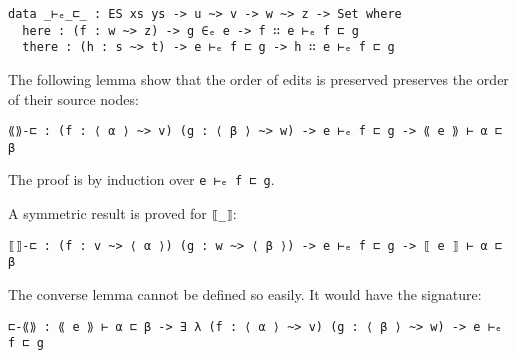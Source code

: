 \documentclass[../Thesis.tex]{subfiles}
\begin{document}
\begin{verbatim}
data _⊢ₑ_⊏_ : ES xs ys -> u ~> v -> w ~> z -> Set where
  here : (f : w ~> z) -> g ∈ₑ e -> f ∷ e ⊢ₑ f ⊏ g 
  there : (h : s ~> t) -> e ⊢ₑ f ⊏ g -> h ∷ e ⊢ₑ f ⊏ g 
\end{verbatim}

	The following lemma show that the order of edits is preserved
	preserves the order of their source nodes:	
\begin{verbatim}
⟪⟫-⊏ : (f : ⟨ α ⟩ ~> v) (g : ⟨ β ⟩ ~> w) -> e ⊢ₑ f ⊏ g -> ⟪ e ⟫ ⊢ α ⊏ β
\end{verbatim}

	The proof is by induction over \texttt{e ⊢ₑ f ⊏ g}.
%
	
	A symmetric result is proved for \texttt{⟦\_⟧}:
\begin{verbatim}
⟦⟧-⊏ : (f : v ~> ⟨ α ⟩) (g : w ~> ⟨ β ⟩) -> e ⊢ₑ f ⊏ g -> ⟦ e ⟧ ⊢ α ⊏ β
\end{verbatim}
	
	The converse lemma cannot be defined so easily.
	It would have the signature:
\begin{verbatim}
⊏-⟪⟫ : ⟪ e ⟫ ⊢ α ⊏ β -> ∃ λ (f : ⟨ α ⟩ ~> v) (g : ⟨ β ⟩ ~> w) -> e ⊢ₑ f ⊏ g 
\end{verbatim}
	
\end{document}
